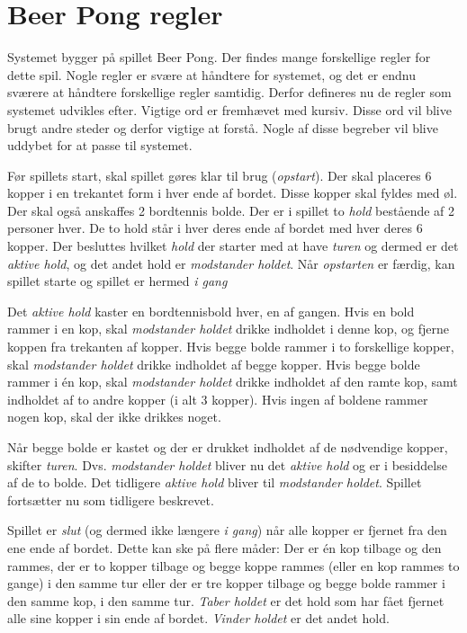\documentclass[Kravspecifikation/Kravspec_Main.tex]{subfiles}
\begin{document}
\section{Beer Pong regler} \label{sec:rules}
Systemet bygger på spillet Beer Pong. Der findes mange forskellige regler for dette spil. Nogle regler er svære at håndtere for systemet, og det er endnu sværere at håndtere forskellige regler samtidig. Derfor defineres nu de regler som systemet udvikles efter. Vigtige ord er fremhævet med kursiv. Disse ord vil blive brugt andre steder og derfor vigtige at forstå. Nogle af disse begreber vil blive uddybet for at passe til systemet.

Før spillets start, skal spillet gøres klar til brug (\textit{opstart}). Der skal placeres 6 kopper i en trekantet form i hver ende af bordet. Disse kopper skal fyldes med øl. Der skal også anskaffes 2 bordtennis bolde.  Der er i spillet to \textit{hold} bestående af 2 personer hver. De to hold står i hver deres ende af bordet med hver deres 6 kopper. Der besluttes hvilket \textit{hold} der starter med at have \textit{turen} og dermed er det \textit{aktive hold}, og det andet hold er \textit{modstander holdet}.  Når \textit{opstarten} er færdig, kan spillet starte og spillet er hermed \textit{i gang}

Det \textit{aktive hold} kaster en bordtennisbold hver, en af gangen. Hvis en bold rammer i en kop, skal \textit{modstander holdet} drikke indholdet i denne kop, og fjerne koppen fra trekanten af kopper. Hvis begge bolde rammer i to forskellige kopper, skal \textit{modstander holdet} drikke indholdet af begge kopper. Hvis begge bolde rammer i én kop, skal \textit{modstander holdet} drikke indholdet af den ramte kop, samt indholdet af to andre kopper (i alt 3 kopper). Hvis ingen af boldene rammer nogen kop, skal der ikke drikkes noget.

Når begge bolde er kastet og der er drukket indholdet af de nødvendige kopper, skifter \textit{turen}. Dvs. \textit{modstander holdet} bliver nu det \textit{aktive hold} og er i besiddelse af de to bolde. Det tidligere \textit{aktive hold} bliver til \textit{modstander holdet}. Spillet fortsætter nu som tidligere beskrevet.

Spillet er \textit{slut} (og dermed ikke længere \textit{i gang}) når alle kopper er fjernet fra den ene ende af bordet. Dette kan ske på flere måder: Der er én kop tilbage og den rammes, der er to kopper tilbage og begge koppe rammes (eller en kop rammes to gange) i den samme tur eller der er tre kopper tilbage og begge bolde rammer i den samme kop, i den samme tur. \textit{Taber holdet} er det hold som har fået fjernet alle sine kopper i sin ende af bordet. \textit{Vinder holdet} er det andet hold. 
\end{document}
